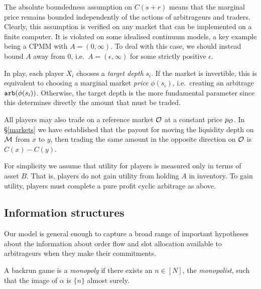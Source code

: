 The absolute boundedness assumption on $C(s+r)$ means that the marginal price remains bounded independently of the actions of arbitrageurs and traders.
%
Clearly, this assumption is verified on any market that can be implemented on a finite computer.
%
It is violated on some idealised continuum models, a key example being a CPMM with $A=(0,\infty)$.
%
To deal with this case, we should instead bound $A$ away from $0$, i.e.~$A=(\epsilon,\infty)$ for some strictly positive $\epsilon$.

In play, each player \(X_i\) chooses a \emph{target depth} \(s_i\). 
%
If the market is invertible, this is equivalent to choosing a marginal market \emph{price} \(\phi(s_i)\), i.e.~creating an arbitrage $\mathtt{arb}(\phi(s_i))$.
%
Otherwise, the target depth is the more fundamental parameter since this determines directly the amount that must be traded.

All players may also trade on a reference market \(\mathcal{O}\) at a constant price \(p_{\mathcal{O}}\).
%
In \S\ref{markets} we have established that the payout for moving the liquidity depth on $\mathcal{M}$ from $x$ to $y$, then trading the same amount in the opposite direction on $\mathcal{O}$ is $C(x)-C(y)$.

For simplicity we assume that utility for players is measured only in terms of asset \(B\). 
%
That is, players do not gain utility from holding \(A\) in inventory.
%
To gain utility, players must complete a pure profit cyclic arbitrage as above.

\subsection{Information structures} 

Our model is general enough to capture a broad range of important hypotheses about the information about order flow and slot allocation available to arbitrageurs when they make their commitments.

\begin{definition}[Monopoly] \label{monopoly}

  A backrun game is a \emph{monopoly} if there exists an $n\in[N]$, the \emph{monopolist}, such that the image of $\alpha$ is $\{n\}$ almost surely.

\end{definition}

